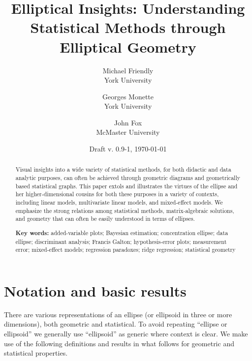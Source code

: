 \documentclass[11pt]{article}%
\newcommand{\keywords}[1]{\par\noindent\textbf{Key words:} #1}
\begin{document}
\begin{titlepage}
\title{Elliptical Insights: Understanding Statistical Methods through Elliptical Geometry}

\author{Michael Friendly%
 \\ York University
\and
Georges Monette \\ York University
\and
John Fox \\ McMaster University
}
\date{Draft v. 0.9-1, \today}
\end{titlepage}
\maketitle

\begin{abstract}
Visual insights into  a wide variety  of statistical methods,  for both didactic
and data analytic purposes, can often be achieved through geometric diagrams  and
geometrically based statistical graphs.  This  paper extols and illustrates  the
virtues  of  the  ellipse  and her  higher-dimensional  cousins  for  both these
purposes in a variety of contexts, including linear models, multivariate
linear models, and mixed-effect models.
We emphasize the strong relations among statistical methods, matrix-algebraic
solutions, and geometry that can often be easily understood in terms of
ellipses.

\keywords{
added-variable plots;
Bayesian estimation;
concentration ellipse;
data ellipse;
discriminant analysis;
Francis Galton;
hypothesis-error plots;
measurement error;
mixed-effect models;
regression paradoxes;
ridge regression;
statistical geometry
}
\end{abstract}



\section{Notation and basic results}

There are various representations of an ellipse (or ellipsoid in three or more dimensions),
both geometric and statistical.
To avoid repeating ``ellipse or ellipsoid'' we generally use ``ellipsoid'' as generic where context is clear.
We make use of the following definitions and results in what follows for geometric and
statistical properties.
\end{document}
